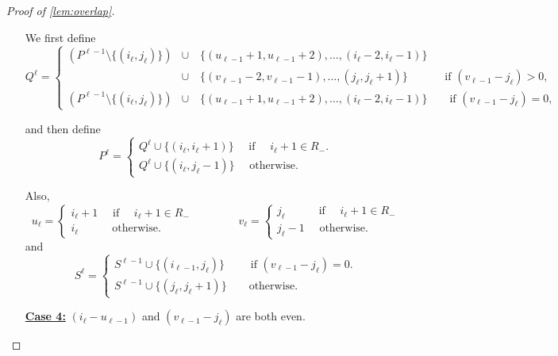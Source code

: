 \documentclass[10pt,a4paper]{article}
\theoremstyle{definition}%
\theoremstyle{plain}
\begin{document}
\begin{proof}[Proof of \autoref{lem:overlap}]
\begin{enumerate}
        We first define
        \[
            Q^\ell = \begin{cases}
                (P^{\ell-1} \setminus \{(i_\ell, j_\ell)\}) &\cup \quad \{(u_{\ell-1}+1, u_{\ell-1}+2), \ldots, (i_\ell -2, i_\ell -1)\} \\
                &\cup \quad \{(v_{\ell-1}-2, v_{\ell-1}-1), \ldots, (j_\ell, j_\ell +1)\} 
                \qquad \quad \text{ if } (v_{\ell-1} - j_\ell) > 0, \\
                (P^{\ell-1} \setminus \{(i_\ell, j_\ell)\}) &\cup \quad \{(u_{\ell-1}+1, u_{\ell-1}+2), \ldots, (i_\ell -2, i_\ell -1)\} \qquad \text{if } (v_{\ell-1} - j_\ell) = 0,
            \end{cases}
        \]
        
        and then define
        \[
            P^\ell = \begin{cases}
                Q^\ell \cup \{(i_\ell, i_\ell +1)\} \quad \text{ if } \quad i_\ell +1 \in R_-.\\
                Q^\ell \cup \{(i_\ell, j_\ell -1)\} \quad \text{ otherwise.} 
                \end{cases} 
        \]
        
        Also,
        \[
            u_\ell = \begin{cases}
                i_\ell +1 \quad \text{ if } \quad i_\ell +1 \in R_-\\
                i_\ell \qquad \quad \text{otherwise.} 
            \end{cases} 
            \qquad \qquad 
            v_\ell = \begin{cases}
                j_\ell \qquad \quad \text{if } \quad i_\ell +1 \in R_-\\
                j_\ell -1 \quad \text{ otherwise.} 
            \end{cases} 
        \]
        and
        \[
            S^\ell = \begin{cases}
                S^{\ell -1} \cup \{(i_{\ell -1}, j_\ell)\} \qquad \text{ if } (v_{\ell -1} - j_\ell) = 0.  \\
                S^{\ell -1} \cup \{(j_\ell, j_\ell +1)\} \qquad \text{otherwise.}
            \end{cases}
        \]

        \item[\underline{\textbf{Case 4:}}]  $(i_\ell - u_{\ell-1})$ and $(v_{\ell-1} - j_\ell)$ are both even.


\end{enumerate}
\end{proof}
\end{document}
